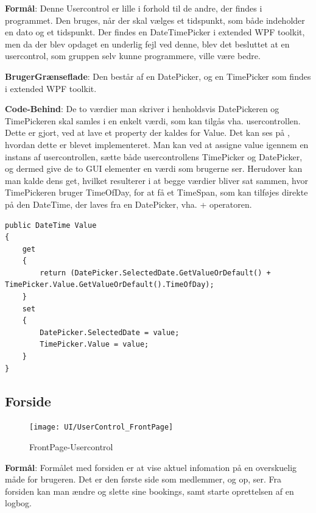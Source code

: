 \textbf{Formål}: Denne Usercontrol er lille i forhold til de andre, der findes i programmet.
Den bruges, når der skal vælges et tidspunkt, som både indeholder en dato og et tidspunkt. 
Der findes en DateTimePicker i extended WPF toolkit, men da der blev opdaget en underlig fejl ved denne, blev det besluttet at en usercontrol, som gruppen selv kunne programmere, ville være bedre. 

\textbf{BrugerGrænseflade}: Den består af en DatePicker, og en TimePicker som findes i extended WPF toolkit.

\textbf{Code-Behind}: De to værdier man skriver i henholdsvis DatePickeren og TimePickeren skal samles i en enkelt værdi, som kan tilgås vha. usercontrollen. 
Dette er gjort, ved at lave et property der kaldes for Value. 
Det kan ses på , hvordan dette er blevet implementeret.
Man kan ved at assigne value igennem en instans af usercontrollen, sætte både usercontrollens TimePicker og DatePicker, og dermed give de to GUI elementer en værdi som brugerne ser.
Herudover kan man kalde dens get, hvilket resulterer i at begge værdier bliver sat sammen, hvor TimePickeren bruger TimeOfDay, for at få et TimeSpan, som kan tilføjes direkte på den DateTime, der laves fra en DatePicker, vha. + operatoren.

\begin{lstlisting}[frame=single, caption=DateTimePicker Value, label=DateTimePickerValue]
public DateTime Value
{
    get
    {
        return (DatePicker.SelectedDate.GetValueOrDefault() + TimePicker.Value.GetValueOrDefault().TimeOfDay);
    }
    set
    {
        DatePicker.SelectedDate = value;
        TimePicker.Value = value;
    }
}
\end{lstlisting}

\subsection{Forside}
\begin{figure}
    \label{img:frontpage}
    \vspace{-10pt}
    \begin{center}
        \texttt{[image: UI/UserControl\_FrontPage]}
    \end{center}
    \vspace{-15pt}
    \caption{FrontPage-Usercontrol}
\end{figure}

\textbf{Formål}: 
Formålet med forsiden er at vise aktuel infomation på en overskuelig måde for brugeren.
Det er den første side som medlemmer, og op, ser.
Fra forsiden kan man ændre og slette sine bookings, samt starte oprettelsen af en logbog.

